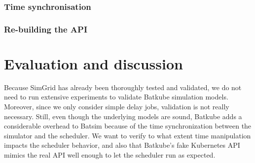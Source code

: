 \documentclass[12pt, a4paper]{memoir}
\begin{document}
\subsection{Time synchronisation}

%
%
%
%

\subsection{Re-building the API}

\chapter{Evaluation and discussion}

Because SimGrid has already been thoroughly tested and validated, we do not
need to run extensive experiments to validate Batkube simulation models.
Moreover, since we only consider simple delay jobs, validation is not really
necessary. Still, even though the underlying models are sound, Batkube adds a
considerable overhead to Batsim because of the time synchronization between the
simulator and the scheduler. We want to verify to what extent time manipulation
impacts the scheduler behavior, and also that Batkube's fake Kubernetes API
mimics the real API well enough to let the scheduler run as expected.
\end{document}
